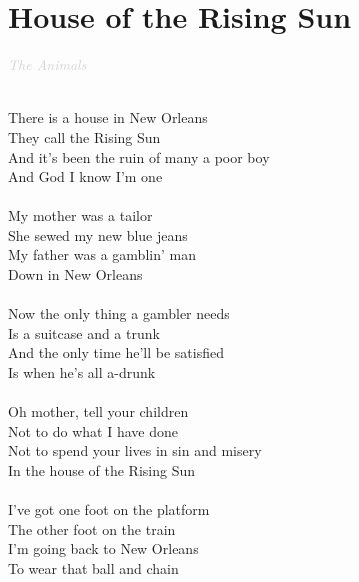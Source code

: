 \documentclass[a5paper, 10pt]{book}
\begin{document}
\section{House of the Rising Sun}\textcolor{lightgray}{\textit{The Animals}}\\~\\
\begin{minipage}[t]{0.8\textwidth}
  There is a house in New Orleans\\
  They call the Rising Sun\\
  And it's been the ruin of many a poor boy\\
  And God I know I'm one\\
  \\
  My mother was a tailor\\
  She sewed my new blue jeans\\
  My father was a gamblin' man\\
  Down in New Orleans\\
  \\
  Now the only thing a gambler needs\\
  Is a suitcase and a trunk\\
  And the only time he'll be satisfied\\
  Is when he's all a-drunk\\
  \\
  Oh mother, tell your children\\
  Not to do what I have done\\
  Not to spend your lives in sin and misery\\
  In the house of the Rising Sun\\
  \\
  I've got one foot on the platform\\
  The other foot on the train\\
  I'm going back to New Orleans\\
  To wear that ball and chain\\

\end{minipage}
\end{document}

